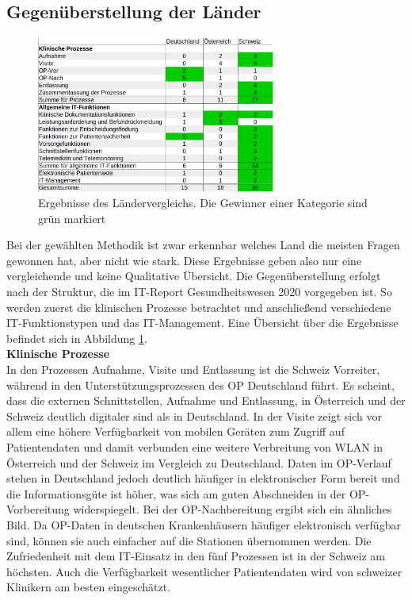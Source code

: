\subsection{Gegenüberstellung der Länder}
\begin{figure}
	\centering
	\includegraphics[width=0.7\textwidth]{Bilder/laendervergleich_ergebnisse.png}
	\caption{Ergebnisse des Ländervergleichs. Die Gewinner einer Kategorie sind grün markiert}
	\label{fig:laender_ergebnisse}
\end{figure}
Bei der gewählten Methodik ist zwar erkennbar welches Land die meisten Fragen gewonnen hat, aber nicht wie stark. Diese Ergebnisse geben also nur eine vergleichende und keine Qualitative Übersicht. Die Gegenüberstellung erfolgt nach der Struktur, die im IT-Report Gesundheitswesen 2020 vorgegeben ist. So werden zuerst die klinischen Prozesse betrachtet und anschließend verschiedene IT-Funktionstypen und das IT-Management. Eine Übersicht über die Ergebnisse befindet sich in Abbildung \ref{fig:laender_ergebnisse}.
\vspace{\parheadvspace}\\
\textbf{Klinische Prozesse}\\
In den Prozessen Aufnahme, Visite und Entlassung ist die Schweiz Vorreiter, während in den Unterstützungsprozessen des OP Deutschland führt. Es scheint, dass die externen Schnittstellen, Aufnahme und Entlassung, in Österreich und der Schweiz deutlich digitaler sind als in Deutschland. In der Visite zeigt sich vor allem eine höhere Verfügbarkeit von mobilen Geräten zum Zugriff auf Patientendaten und damit verbunden eine weitere Verbreitung von WLAN in Österreich und der Schweiz im Vergleich zu Deutschland. Daten im OP-Verlauf stehen in Deutschland jedoch deutlich häufiger in elektronischer Form bereit und die Informationsgüte ist höher, was sich am guten Abschneiden in der OP-Vorbereitung widerspiegelt. Bei der OP-Nachbereitung ergibt sich ein ähnliches Bild. Da OP-Daten in deutschen Krankenhäusern häufiger elektronisch verfügbar sind, können sie auch einfacher auf die Stationen übernommen werden. Die Zufriedenheit mit dem IT-Einsatz in den fünf Prozessen ist in der Schweiz am höchsten. Auch die Verfügbarkeit wesentlicher Patientendaten wird von schweizer Klinikern am besten eingeschätzt.
